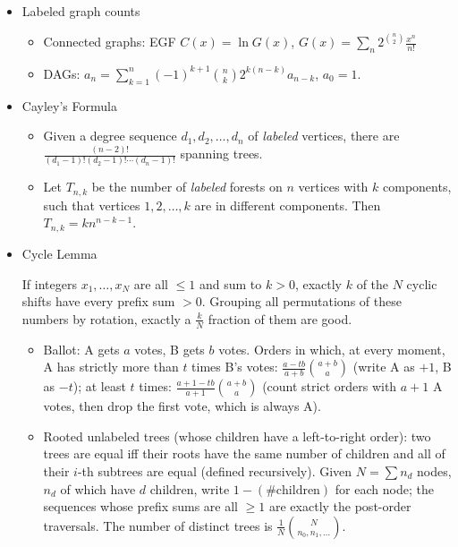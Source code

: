 \begin{itemize}
\item Labeled graph counts

\begin{itemize}
  \item Connected graphs: EGF $C(x) = \ln G(x)$, $G(x) = \sum_n 2^{\binom n 2} \frac{x^n}{n!}$
  \item DAGs: $a_n = \sum_{k=1}^{n} (-1)^{k+1} \binom nk 2^{k(n-k)} a_{n-k}$, $a_0 = 1$.
\end{itemize}

\item Cayley's Formula

\begin{itemize}
  \item Given a degree sequence $d_1, d_2, \ldots, d_n$ of \textit{labeled} vertices, there are $\frac{(n - 2)!}{(d_1 - 1)!(d_2 - 1)!\cdots(d_n - 1)!}$ spanning trees.
  \item Let $T_{n, k}$ be the number of \textit{labeled} forests on $n$ vertices with $k$ components, such that vertices $1, 2, \ldots, k$ are in different components. Then $T_{n, k} = kn^{n - k - 1}$.
\end{itemize}

\item Cycle Lemma

If integers $x_1, \ldots, x_N$ are all $\le 1$ and sum to $k > 0$, exactly $k$ of the $N$ cyclic shifts have every prefix sum $> 0$. Grouping all permutations of these numbers by rotation, exactly a $\frac{k}{N}$ fraction of them are good.
\begin{itemize}
  \item Ballot: A gets $a$ votes, B gets $b$ votes. Orders in which, at every moment, A has strictly more than $t$ times B's votes: $\frac{a - tb}{a + b}\binom{a + b}{a}$ (write A as $+1$, B as $-t$); at least $t$ times: $\frac{a + 1 - tb}{a + 1}\binom{a + b}{a}$ (count strict orders with $a + 1$ A votes, then drop the first vote, which is always A).
  \item Rooted unlabeled trees (whose children have a left-to-right order): two trees are equal iff their roots have the same number of children and all of their $i$-th subtrees are equal (defined recursively). Given $N = \sum n_d$ nodes, $n_d$ of which have $d$ children, write $1 - (\#\text{children})$ for each node; the sequences whose prefix sums are all $\ge 1$ are exactly the post-order traversals. The number of distinct trees is $\frac{1}{N}\binom{N}{n_0, n_1, \ldots}$.
\end{itemize}


\end{itemize}
